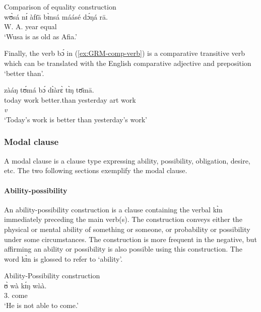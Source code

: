 \ea\label{ex:GRM-comp-equal}{\rm  Comparison of equality construction}\\

\gll wʊ̀sá nɪ́ àfɪ̄ā bɪ̀nsá máásé dɔ́ŋá rā.\\
W. {\conn} A.  year equal {\recp} {\foc}\\

\glt `Wusa is as old as Afia.'
\z


Finally,  the verb {\sls bɔ́} in (\ref{ex:GRM-comp-verb}) is a comparative
transitive verb which can be translated with the English comparative adjective and preposition `better than'.


\ea\label{ex:GRM-comp-verb}
\glll zàáŋ tʊ́má bɔ́ dɪ̀àrɛ̀ tɪ̀ŋ tʊ̄mā.\\
today work better.than yesterday {\sc art} work\\
{}  {} {\it v} {} {}  {}\\
\glt `Today's work is better than yesterday's work'
\z


\subsubsection{Modal clause}
\label{sec:GRM-modalclause}

A modal clause is a clause type expressing  ability, possibility,   obligation, desire, etc. The two following sections exemplify the modal clause. 

\paragraph{Ability-possibility}
\label{sec:GRM-ability-possibility}

An ability-possibility construction is a clause containing the verbal {\sls kɪ̀n} immediately 
preceding the main verb(s).  The construction conveys either the physical or mental ability of 
something or someone, or probability or possibility under some circumstances. The construction is 
more frequent in the negative, but affirming an ability or possibility is also possible using this construction. The word {\sls kɪ̀n} is glossed  {\abi} to refer to `ability'.


\ea
{\upshape Ability-Possibility construction}\\

\ea
\label{ex:GRM-modal-12.2}
\gll ʊ̀ wà kɪ́ŋ wàà.\\
{3.\sg} {\neg} {\abi} come\\
\glt  `He is not able to come.'

